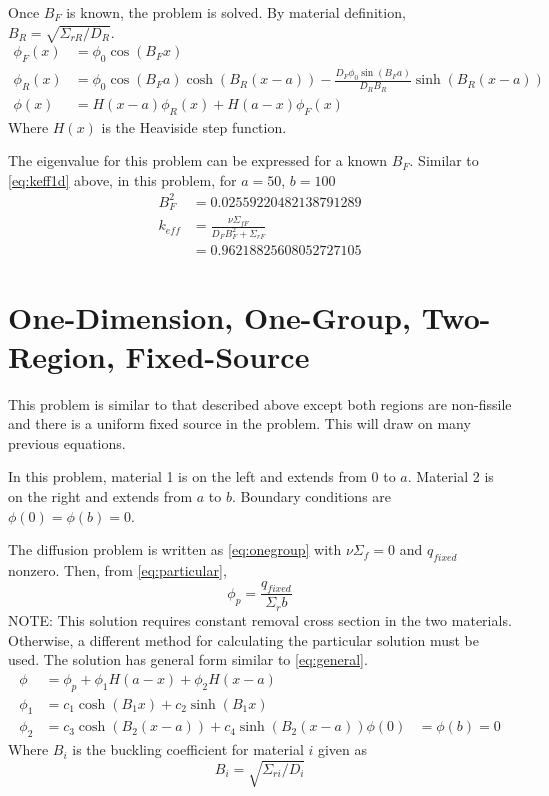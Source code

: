   Once $B_F$ is known, the problem is solved. By material definition, 
  ${B_R = \sqrt{\Sigma_{rR}/D_R}}$.
  \begin{align}
    \phi_F(x) &= \phi_0 \cos(B_F x)\\
    \phi_R(x) &= \phi_0 \cos(B_F a) \cosh(B_R (x-a)) 
      - \frac{D_F \phi_0 \sin(B_F a)}{D_R B_R} \sinh(B_R (x-a))\\
    \phi(x) &= H(x-a)\phi_R(x) + H(a-x)\phi_F(x)
  \end{align}
  Where $H(x)$ is the Heaviside step function.  
  
  The eigenvalue for this problem can be expressed for a known $B_F$. Similar 
  to \eqref{eq:keff1d} above, in this problem, for $a=50$, $b=100$
  \begin{align}
    B_F^2  &= 0.02559220482138791289 \\
    k_{eff} &= \frac{\nu\Sigma_{fF}}{D_F B_F^2 + \Sigma_{rF}} \\
    &= 0.96218825608052727105
  \end{align}
  
\section{One-Dimension, One-Group, Two-Region, Fixed-Source}
  This problem is similar to that described above except both regions are 
  non-fissile and there is a uniform fixed source in the problem. This will 
  draw on many previous equations.
  
  In this problem, material 1 is on the left and extends from 0 to $a$. 
  Material 2 is on the right and extends from $a$ to $b$. Boundary conditions 
  are $\phi(0)=\phi(b)=0$.
  
  The diffusion problem is written as \eqref{eq:onegroup} with 
  $\nu \Sigma_f =0$ and $q_{fixed}$ nonzero. Then, from \eqref{eq:particular},
  \begin{equation}
  	\phi_p = \frac{q_{fixed}}{\Sigma_r b}
  \end{equation}
  NOTE: This solution requires constant removal cross section in the two 
  materials. Otherwise, a different method for calculating the particular 
  solution must be used. The solution has general form similar to
  \eqref{eq:general}.
  \begin{align}
  	\phi &= \phi_p + \phi_1 H(a-x) + \phi_2 H(x-a) \\
    \phi_1 &= c_1 \cosh(B_1 x) + c_2 \sinh(B_1 x) \\
    \phi_2 &= c_3 \cosh(B_2 (x-a)) + c_4 \sinh(B_2 (x-a))
    \phi(0)&=\phi(b)=0
  \end{align}
  Where $B_i$ is the buckling coefficient for material $i$ given as
  \begin{equation}
    B_i = \sqrt{\Sigma_{ri} / D_i}
  \end{equation}
  
